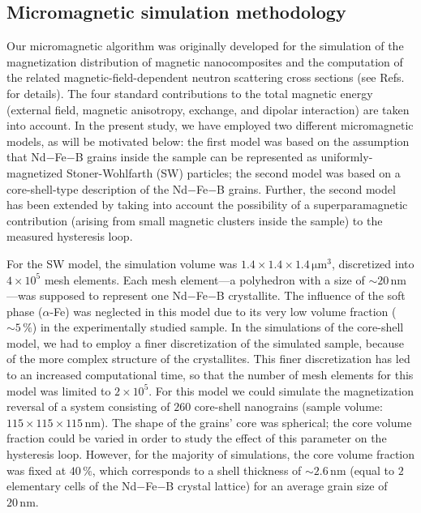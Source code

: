 \documentclass[prm,twocolumn,showkeys,preprintnumbers,amsmath,amssymb,superscriptaddress,aps,10pt]{revtex4-1}
\begin{document}
\subsection{Micromagnetic simulation methodology \label{mumagmethod}}

Our micromagnetic algorithm was originally developed for the simulation of the magnetization distribution of magnetic nanocomposites and the computation of the related magnetic-field-dependent neutron scattering cross sections (see Refs.~ for details). The four standard contributions to the total magnetic energy (external field, magnetic anisotropy, exchange, and dipolar interaction) are taken into account. In the present study, we have employed two different micromagnetic models, as will be motivated below: the first model was based on the assumption that Nd$-$Fe$-$B grains inside the sample can be represented as uniformly-magnetized Stoner-Wohlfarth (SW) particles; the second model was based on a core-shell-type description of the Nd$-$Fe$-$B grains. Further, the second model has been extended by taking into account the possibility of a superparamagnetic contribution (arising from small magnetic clusters inside the sample) to the measured hysteresis loop. 

For the SW model, the simulation volume was $1.4 \times 1.4 \times 1.4 \, \mathrm{\mu m}^3$, discretized into $4 \times 10^5$ mesh elements. Each mesh element---a polyhedron with a size of $\sim 20 \, \mathrm{nm}$---was supposed to represent one Nd$-$Fe$-$B crystallite. The influence of the soft phase ($\alpha$-Fe) was neglected in this model due to its very low volume fraction ($\sim 5 \, \%$) in the experimentally studied sample. In the simulations of the core-shell model, we had to employ a finer discretization of the simulated sample, because of the more complex structure of the crystallites. This finer discretization has led to an increased computational time, so that the number of mesh elements for this model was limited to $2 \times 10^5$. For this model we could simulate the magnetization reversal of a system consisting of $260$ core-shell nanograins (sample volume: $115 \times 115 \times 115 \, \mathrm{nm}$). The shape of the grains' core was spherical; the core volume fraction could be varied in order to study the effect of this parameter on the hysteresis loop. However, for the majority of simulations, the core volume fraction was fixed at $40 \, \%$, which corresponds to a shell thickness of $\sim 2.6 \, \mathrm{nm}$ (equal to $2$ elementary cells of the Nd$-$Fe$-$B crystal lattice) for an average grain size of $20 \, \mathrm{nm}$. 
\end{document}
